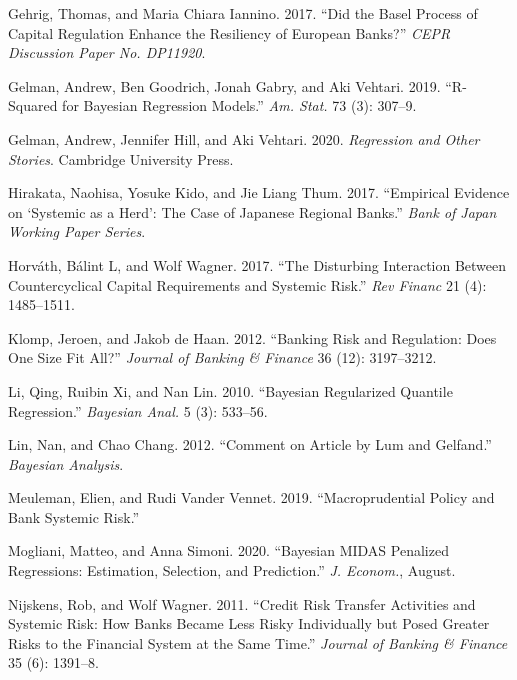 \documentclass[
  10pt,
]{article}
\begin{document}
\leavevmode\hypertarget{ref-Gehrig2017}{}%
Gehrig, Thomas, and Maria Chiara Iannino. 2017. ``Did the Basel Process
of Capital Regulation Enhance the Resiliency of European Banks?''
\emph{CEPR Discussion Paper No. DP11920}.

\leavevmode\hypertarget{ref-Gelman2019}{}%
Gelman, Andrew, Ben Goodrich, Jonah Gabry, and Aki Vehtari. 2019.
``R-Squared for Bayesian Regression Models.'' \emph{Am. Stat.} 73 (3):
307--9.

\leavevmode\hypertarget{ref-Gelman2020}{}%
Gelman, Andrew, Jennifer Hill, and Aki Vehtari. 2020. \emph{Regression
and Other Stories}. Cambridge University Press.

\leavevmode\hypertarget{ref-Hirakata2017}{}%
Hirakata, Naohisa, Yosuke Kido, and Jie Liang Thum. 2017. ``Empirical
Evidence on `Systemic as a Herd': The Case of Japanese Regional Banks.''
\emph{Bank of Japan Working Paper Series}.

\leavevmode\hypertarget{ref-Horvath2017}{}%
Horváth, Bálint L, and Wolf Wagner. 2017. ``The Disturbing Interaction
Between Countercyclical Capital Requirements and Systemic Risk.''
\emph{Rev Financ} 21 (4): 1485--1511.

\leavevmode\hypertarget{ref-Klomp2012}{}%
Klomp, Jeroen, and Jakob de Haan. 2012. ``Banking Risk and Regulation:
Does One Size Fit All?'' \emph{Journal of Banking \& Finance} 36 (12):
3197--3212.

\leavevmode\hypertarget{ref-Li2010}{}%
Li, Qing, Ruibin Xi, and Nan Lin. 2010. ``Bayesian Regularized Quantile
Regression.'' \emph{Bayesian Anal.} 5 (3): 533--56.

\leavevmode\hypertarget{ref-Lin2012}{}%
Lin, Nan, and Chao Chang. 2012. ``Comment on Article by Lum and
Gelfand.'' \emph{Bayesian Analysis}.

\leavevmode\hypertarget{ref-Meuleman2019}{}%
Meuleman, Elien, and Rudi Vander Vennet. 2019. ``Macroprudential Policy
and Bank Systemic Risk.''

\leavevmode\hypertarget{ref-Mogliani2020}{}%
Mogliani, Matteo, and Anna Simoni. 2020. ``Bayesian MIDAS Penalized
Regressions: Estimation, Selection, and Prediction.'' \emph{J. Econom.},
August.

\leavevmode\hypertarget{ref-Nijskens2011}{}%
Nijskens, Rob, and Wolf Wagner. 2011. ``Credit Risk Transfer Activities
and Systemic Risk: How Banks Became Less Risky Individually but Posed
Greater Risks to the Financial System at the Same Time.'' \emph{Journal
of Banking \& Finance} 35 (6): 1391--8.
\end{document}
